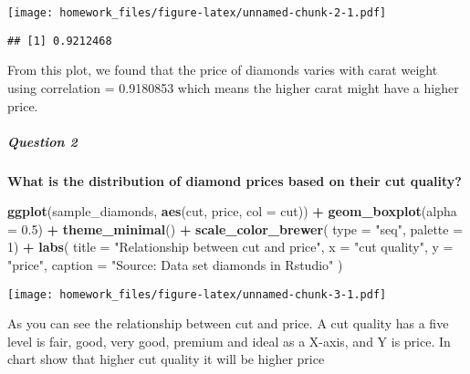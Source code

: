 \documentclass[
]{article}
\newenvironment{Shaded}{\begin{snugshade}}{\end{snugshade}}
\newcommand{\AttributeTok}[1]{\textcolor[rgb]{0.13,0.29,0.53}{#1}}
\newcommand{\DecValTok}[1]{\textcolor[rgb]{0.00,0.00,0.81}{#1}}
\newcommand{\FloatTok}[1]{\textcolor[rgb]{0.00,0.00,0.81}{#1}}
\newcommand{\FunctionTok}[1]{\textcolor[rgb]{0.13,0.29,0.53}{\textbf{#1}}}
\newcommand{\NormalTok}[1]{#1}
\newcommand{\SpecialCharTok}[1]{\textcolor[rgb]{0.81,0.36,0.00}{\textbf{#1}}}
\newcommand{\StringTok}[1]{\textcolor[rgb]{0.31,0.60,0.02}{#1}}
\begin{document}
\texttt{[image: homework\_files/figure-latex/unnamed-chunk-2-1.pdf]}

\begin{Shaded}
\end{Shaded}

\begin{verbatim}
## [1] 0.9212468
\end{verbatim}

From this plot, we found that the price of diamonds varies with carat
weight using correlation = 0.9180853 which means the higher carat might
have a higher price.

\hypertarget{question-2}{%
\subparagraph{\texorpdfstring{\textbf{Question
2}}{Question 2}}\label{question-2}}

\textbf{What is the distribution of diamond prices based on their cut
quality?}

\begin{Shaded}
\begin{Highlighting}[]
\FunctionTok{ggplot}\NormalTok{(sample\_diamonds, }\FunctionTok{aes}\NormalTok{(cut, price, }\AttributeTok{col =}\NormalTok{ cut)) }\SpecialCharTok{+}
  \FunctionTok{geom\_boxplot}\NormalTok{(}\AttributeTok{alpha =} \FloatTok{0.5}\NormalTok{) }\SpecialCharTok{+}
  \FunctionTok{theme\_minimal}\NormalTok{() }\SpecialCharTok{+}
  \FunctionTok{scale\_color\_brewer}\NormalTok{( }\AttributeTok{type =} \StringTok{"seq"}\NormalTok{,}
                      \AttributeTok{palette =} \DecValTok{1}\NormalTok{) }\SpecialCharTok{+}
  \FunctionTok{labs}\NormalTok{(}
    \AttributeTok{title =} \StringTok{"Relationship between cut and price"}\NormalTok{,}
    \AttributeTok{x =} \StringTok{"cut quality"}\NormalTok{,}
    \AttributeTok{y =} \StringTok{"price"}\NormalTok{,}
    \AttributeTok{caption =} \StringTok{"Source: Data set diamonds in Rstudio"}
\NormalTok{  )}
\end{Highlighting}
\end{Shaded}

\texttt{[image: homework\_files/figure-latex/unnamed-chunk-3-1.pdf]}

As you can see the relationship between cut and price. A cut quality has
a five level is fair, good, very good, premium and ideal as a X-axis,
and Y is price. In chart show that higher cut quality it will be higher
price
\end{document}
